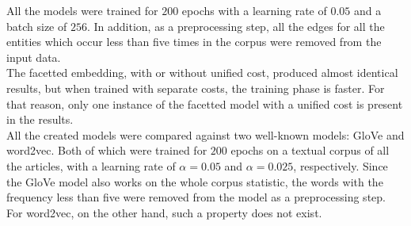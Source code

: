 \noindent
All the models were trained for $200$ epochs with a learning rate of $0.05$ and a batch size of $256$. In addition, as a preprocessing step, all the edges for all the entities which occur less than five times in the corpus were removed from the input data. \\
The facetted embedding, with or without unified cost, produced almost identical results, but when trained with separate costs, the training phase is faster. For that reason, only one instance of the facetted model with a unified cost is present in the results. \\
\noindent
All the created models were compared against two well-known models: GloVe and word2vec. Both of which were trained for $200$ epochs on a textual corpus of all the articles, with a learning rate of $\alpha=0.05$ and $\alpha=0.025$, respectively. Since the GloVe model also works on the whole corpus statistic, the words with the frequency less than five were removed from the model as a preprocessing step. For word2vec, on the other hand, such a property does not exist. 

